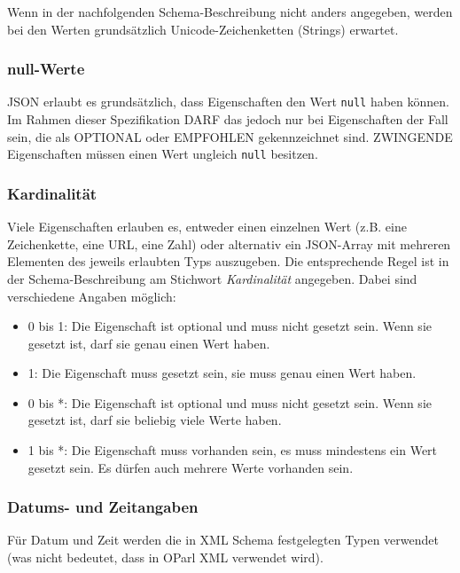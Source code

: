 \documentclass[,a4paper]{article}
\begin{document}
Wenn in der nachfolgenden Schema-Beschreibung nicht anders angegeben,
werden bei den Werten grundsätzlich Unicode-Zeichenketten (Strings)
erwartet.

\subsubsection{null-Werte}\label{null-werte}

JSON erlaubt es grundsätzlich, dass Eigenschaften den Wert \texttt{null}
haben können. Im Rahmen dieser Spezifikation DARF das jedoch nur bei
Eigenschaften der Fall sein, die als OPTIONAL oder EMPFOHLEN
gekennzeichnet sind. ZWINGENDE Eigenschaften müssen einen Wert ungleich
\texttt{null} besitzen.

\subsubsection{Kardinalität}\label{kardinalituxe4t}

Viele Eigenschaften erlauben es, entweder einen einzelnen Wert (z.B.
eine Zeichenkette, eine URL, eine Zahl) oder alternativ ein JSON-Array
mit mehreren Elementen des jeweils erlaubten Typs auszugeben. Die
entsprechende Regel ist in der Schema-Beschreibung am Stichwort
\emph{Kardinalität} angegeben. Dabei sind verschiedene Angaben möglich:

\begin{itemize}
\item
  0 bis 1: Die Eigenschaft ist optional und muss nicht gesetzt sein.
  Wenn sie gesetzt ist, darf sie genau einen Wert haben.
\item
  1: Die Eigenschaft muss gesetzt sein, sie muss genau einen Wert haben.
\item
  0 bis *: Die Eigenschaft ist optional und muss nicht gesetzt sein.
  Wenn sie gesetzt ist, darf sie beliebig viele Werte haben.
\item
  1 bis *: Die Eigenschaft muss vorhanden sein, es muss mindestens ein
  Wert gesetzt sein. Es dürfen auch mehrere Werte vorhanden sein.
\end{itemize}

\subsubsection{Datums- und Zeitangaben}\label{datums--und-zeitangaben}

Für Datum und Zeit werden die in XML Schema festgelegten Typen verwendet
(was nicht bedeutet, dass in OParl XML verwendet wird).
\end{document}
